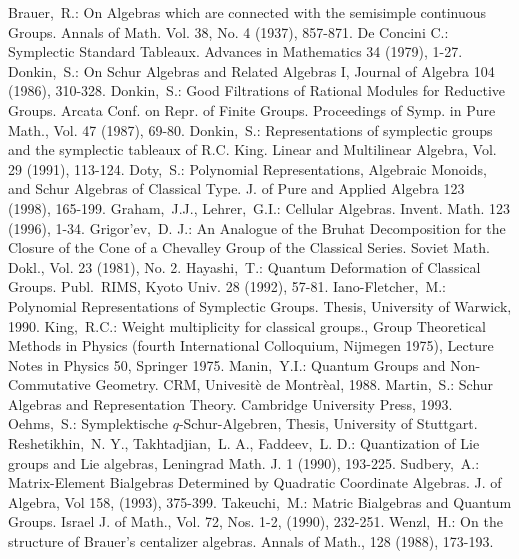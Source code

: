 \documentclass[twoside,12pt]{article}
\begin{document}
\begin{thebibliography}{abcd}
 Brauer,\ R.: On Algebras which are connected with the
        semisimple continuous Groups. Annals of Math. Vol. 38, No. 4 (1937),
        857-871.
 De Concini C.: Symplectic Standard Tableaux. Advances
        in Mathematics 34 (1979), 1-27.
 Donkin,\ S.: On Schur Algebras and Related Algebras I,
        Journal of Algebra 104 (1986), 310-328.
 Donkin,\ S.: Good Filtrations of Rational Modules for
        Reductive Groups. Arcata Conf. on Repr. of Finite Groups. Proceedings
        of Symp. in Pure Math., Vol. 47 (1987), 69-80.
 Donkin,\ S.: Representations of symplectic groups and the
       symplectic tableaux of R.C. King. Linear and Multilinear Algebra, Vol.
       29  (1991), 113-124.
 Doty,\ S.: Polynomial Representations, Algebraic Monoids,
       and Schur Algebras of Classical Type. J. of 
       Pure and Applied Algebra 123 (1998), 165-199.
 Graham,\ J.J., Lehrer,\ G.I.: Cellular Algebras. 
        Invent. Math. 123 (1996), 1-34.
 Grigor'ev,\ D. J.: An Analogue of the Bruhat Decomposition
       for the Closure of the Cone of a Chevalley Group of the Classical 
       Series. Soviet Math. Dokl., Vol. 23 (1981), No. 2.
 Hayashi,\ T.: Quantum Deformation of Classical Groups. 
       Publ.\ RIMS, Kyoto Univ. 28 (1992), 57-81.
 Iano-Fletcher,\ M.: Polynomial Representations of
       Symplectic Groups. Thesis, University of Warwick, 1990.
 King,\ R.C.: Weight multiplicity for classical groups., 
       Group Theoretical Methods in Physics (fourth International Colloquium,
       Nijmegen 1975), Lecture Notes in Physics 50, Springer 1975.
 Manin,\ Y.I.: Quantum Groups and Non-Commutative Geometry.
       CRM, Univesit\`{e} de Montr\`{e}al, 1988.
 Martin,\ S.: Schur Algebras and Representation Theory.
       Cambridge University Press, 1993.
 Oehms,\ S.: Symplektische $q$-Schur-Algebren, Thesis, 
       University of Stuttgart.
 Reshetikhin,\ N. Y., Takhtadjian,\ L. A., Faddeev,\ L. D.:
       Quantization of Lie groups and Lie algebras, Leningrad Math. J. 1
       (1990), 193-225.
 Sudbery,\ A.: Matrix-Element Bialgebras Determined by
       Quadratic Coordinate Algebras. J. of Algebra, Vol 158, (1993), 375-399.
 Takeuchi,\ M.:  Matric Bialgebras and Quantum Groups.
       Israel J. of Math., Vol. 72, Nos. 1-2, (1990), 232-251.
 Wenzl,\ H.: On the structure of Brauer's centalizer
       algebras. Annals of Math., 128 (1988), 173-193.
\end{thebibliography}
\end{document}
